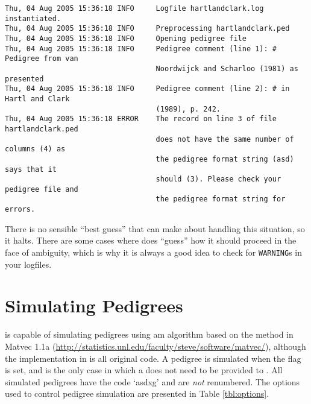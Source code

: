 \begin{verbatim}
Thu, 04 Aug 2005 15:36:18 INFO     Logfile hartlandclark.log instantiated.
Thu, 04 Aug 2005 15:36:18 INFO     Preprocessing hartlandclark.ped
Thu, 04 Aug 2005 15:36:18 INFO     Opening pedigree file
Thu, 04 Aug 2005 15:36:18 INFO     Pedigree comment (line 1): # Pedigree from van
                                   Noordwijck and Scharloo (1981) as presented
Thu, 04 Aug 2005 15:36:18 INFO     Pedigree comment (line 2): # in Hartl and Clark
                                   (1989), p. 242.
Thu, 04 Aug 2005 15:36:18 ERROR    The record on line 3 of file hartlandclark.ped
                                   does not have the same number of columns (4) as
                                   the pedigree format string (asd) says that it
                                   should (3). Please check your pedigree file and
                                   the pedigree format string for errors.
\end{verbatim}
There is no sensible ``best guess'' that \PyPedal{} can make about handling this situation, so it halts.  There are some cases where \PyPedal{} does ``guess'' how it should proceed in the face of ambiguity, which is why it is always a good idea to check for \texttt{WARNING}s in your logfiles.
\section{Simulating Pedigrees}
\label{sec:pedigree-simulation}
\PyPedal{} is capable of simulating pedigrees using am algorithm based on the  method in Matvec 1.1a (\url{http://statistics.unl.edu/faculty/steve/software/matvec/}), although the implementation in  is all original code. A pedigree is simulated when the  flag is set, and is the only case in which a  does not need to be provided to \PyPedal{}. All simulated pedigrees have the code `asdxg' and are \emph{not} renumbered. The options used to control pedigree simulation are presented in Table \ref{tbl:options}.

